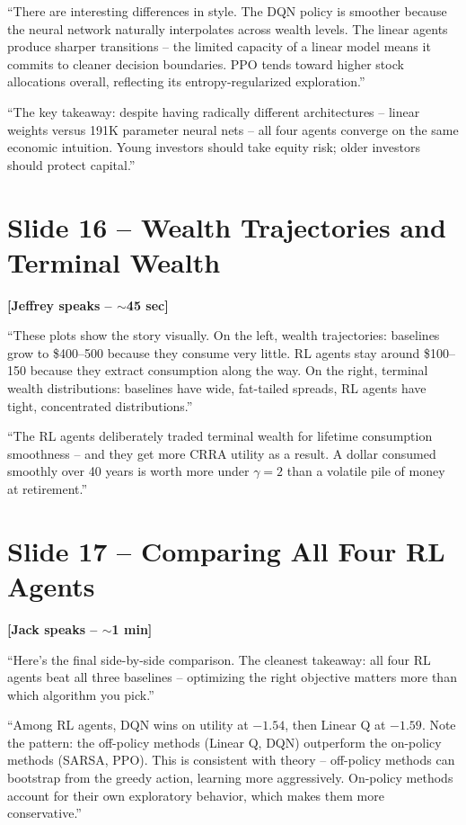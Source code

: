 \documentclass[11pt, letterpaper]{article}
\begin{document}
``There are interesting differences in style. The DQN policy is smoother because the neural network naturally interpolates across wealth levels. The linear agents produce sharper transitions -- the limited capacity of a linear model means it commits to cleaner decision boundaries. PPO tends toward higher stock allocations overall, reflecting its entropy-regularized exploration.''

``The key takeaway: despite having radically different architectures -- linear weights versus 191K parameter neural nets -- all four agents converge on the same economic intuition. Young investors should take equity risk; older investors should protect capital.''

\section{Slide 16 -- Wealth Trajectories and Terminal Wealth}

\textbf{[Jeffrey speaks -- $\sim$45 sec]}

``These plots show the story visually. On the left, wealth trajectories: baselines grow to \$400--500 because they consume very little. RL agents stay around \$100--150 because they extract consumption along the way. On the right, terminal wealth distributions: baselines have wide, fat-tailed spreads, RL agents have tight, concentrated distributions.''

``The RL agents deliberately traded terminal wealth for lifetime consumption smoothness -- and they get more CRRA utility as a result. A dollar consumed smoothly over 40 years is worth more under $\gamma=2$ than a volatile pile of money at retirement.''

\section{Slide 17 -- Comparing All Four RL Agents}

\textbf{[Jack speaks -- $\sim$1 min]}

``Here's the final side-by-side comparison. The cleanest takeaway: all four RL agents beat all three baselines -- optimizing the right objective matters more than which algorithm you pick.''

``Among RL agents, DQN wins on utility at $-1.54$, then Linear Q at $-1.59$. Note the pattern: the off-policy methods (Linear Q, DQN) outperform the on-policy methods (SARSA, PPO). This is consistent with theory -- off-policy methods can bootstrap from the greedy action, learning more aggressively. On-policy methods account for their own exploratory behavior, which makes them more conservative.''
\end{document}
